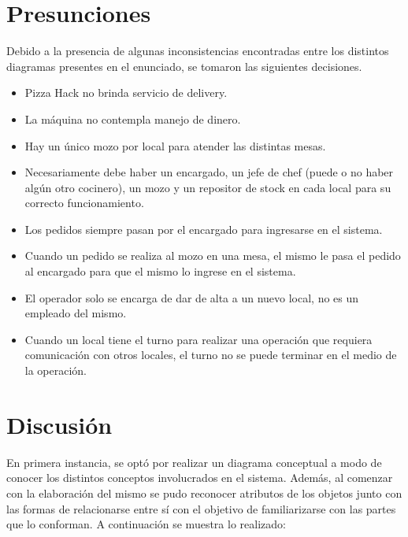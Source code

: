 \documentclass[a4paper,11pt] {article}
\begin{document}
\section*{Presunciones}

Debido a la presencia de algunas inconsistencias encontradas entre los distintos diagramas presentes en el enunciado, se tomaron las siguientes decisiones.

\begin{itemize}
    \item Pizza Hack no brinda servicio de delivery.
    \item La m\'aquina no contempla manejo de dinero.
    \item Hay un \'unico mozo por local para atender las distintas mesas.
    \item Necesariamente debe haber un encargado, un jefe de chef (puede o no haber alg\'un otro cocinero), un mozo y un repositor de stock en cada local para su correcto funcionamiento.
    \item Los pedidos siempre pasan por el encargado para ingresarse en el sistema.
    \item Cuando un pedido se realiza al mozo en una mesa, el mismo le pasa el pedido al encargado para que el mismo lo ingrese en el sistema.
    \item El operador solo se encarga de dar de alta a un nuevo local, no es un empleado del mismo.
		\item Cuando un local tiene el turno para realizar una operaci\'on que requiera comunicaci\'on con otros locales, el turno no se puede terminar en el medio de la operaci\'on.
\end{itemize}

\section*{Discusi\'on}

En primera instancia, se opt\'o por realizar un diagrama conceptual a modo de conocer los distintos conceptos involucrados en el sistema. Adem\'as, al comenzar con la elaboraci\'on del mismo se pudo reconocer atributos de los objetos junto con las formas de relacionarse entre s\'i con el objetivo de familiarizarse con las partes que lo conforman. A continuaci\'on se muestra lo realizado:
\end{document}
